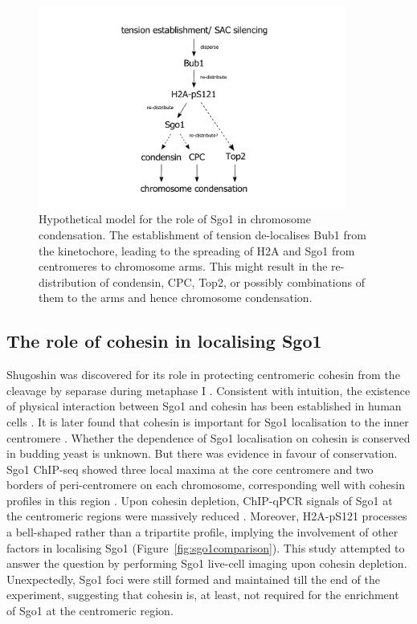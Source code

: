 \begin{figure}[htbp]
  \centering
  \includegraphics[width=0.9\textwidth]{chapter3/figures/ultimate_model.pdf}
  \caption[Hypothetical model for the role of Sgo1 in chromosome condensation]{Hypothetical model for the role of Sgo1 in chromosome condensation. The establishment of tension de-localises Bub1 from the kinetochore, leading to the spreading of H2A and Sgo1 from centromeres to chromosome arms. This might result in the re-distribution of condensin, CPC, Top2, or possibly combinations of them to the arms and hence chromosome condensation. }
  \label{fig:ultimatemodel}
\end{figure}

\subsection{The role of cohesin in localising Sgo1}

Shugoshin was discovered for its role in protecting centromeric cohesin from the cleavage by separase during metaphase I \citep{Kerrebrock1992TheDifferentiation, Marston2004a, Kitajima2004a, Katis2004, Rabitsch2004TwoII}. Consistent with intuition, the existence of physical interaction between Sgo1 and cohesin has been established in human cells \citep{Tanno2009}. It is later found that cohesin is important for Sgo1 localisation to the inner centromere \citep{Liu2013a}. Whether the dependence of Sgo1 localisation on cohesin is conserved in budding yeast is unknown. But there was evidence in favour of conservation. Sgo1 ChIP-seq showed three local maxima at the core centromere and two borders of peri-centromere on each chromosome, corresponding well with cohesin profiles in this region \citep{Deng2018TripartiteChromosomes}. Upon cohesin depletion, ChIP-qPCR signals of Sgo1 at the centromeric regions were massively reduced \citep{Verzijlbergen2014}. Moreover, H2A-pS121 processes a bell-shaped rather than a tripartite profile, implying the involvement of other factors in localising Sgo1 (Figure~\ref{fig:sgo1comparison}). This study attempted to answer the question by performing Sgo1 live-cell imaging upon cohesin depletion. Unexpectedly, Sgo1 foci were still formed and maintained till the end of the experiment, suggesting that cohesin is, at least, not required for the enrichment of Sgo1 at the centromeric region. 


